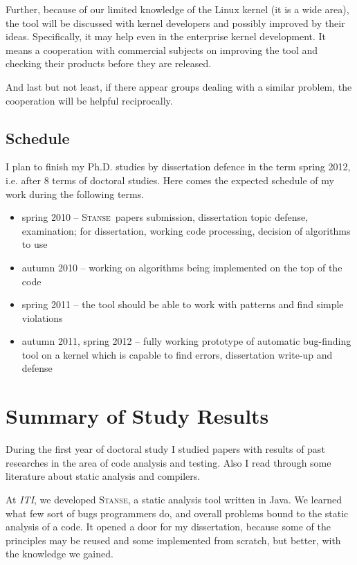 \documentclass[11pt,a4paper]{article}
\newcommand{\stan}{\textsc{Stanse}}
\begin{document}
Further, because of our limited knowledge of the Linux kernel (it is a wide
area), the tool will be discussed with kernel developers and possibly improved
by their ideas. Specifically, it may help even in the enterprise kernel
development. It means a cooperation with commercial subjects on improving the
tool and checking their products before they are released.

And last but not least, if there appear groups dealing with a similar problem,
the cooperation will be helpful reciprocally.

\subsection{Schedule}
I plan to finish my Ph.D. studies by dissertation defence in the term spring
2012, i.e. after 8 terms of doctoral studies. Here comes the expected schedule
of my work during the following terms.
\begin{itemize}
\item spring 2010 -- \stan\ papers submission, dissertation topic defense,
examination; for dissertation, working code processing, decision of algorithms
to use
\item autumn 2010 -- working on algorithms being implemented on the top of the
code
\item spring 2011 -- the tool should be able to work with patterns and find
simple violations
\item autumn 2011, spring 2012 -- fully working prototype of automatic
bug-finding tool on a kernel which is capable to find errors, dissertation
write-up and defense
\end{itemize}

\newpage





\newpage

\section{Summary of Study Results}
\label{results}
During the first year of doctoral study I studied papers with results of past
researches in the area of code analysis and testing. Also I read through some
literature about static analysis and compilers.

At \emph{ITI}, we developed \stan, a static analysis tool written in Java. We
learned what few sort of bugs programmers do, and overall problems bound to
the static analysis of a code. It opened a door for my dissertation, because
some of the principles may be reused and some implemented from scratch, but
better, with the knowledge we gained.
\end{document}
